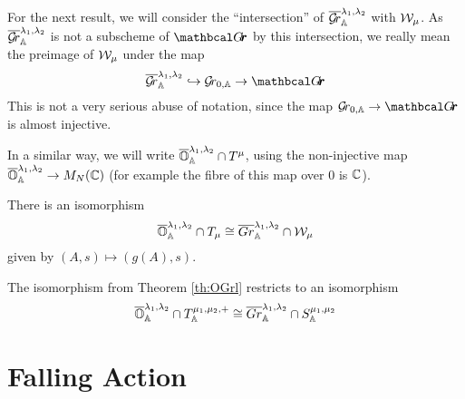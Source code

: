 \documentclass[draft]{article}
\begin{document}
For the next result, we will consider the ``intersection'' of $ \overline{\mathcal{G}\!r}^{\lambda_1, \lambda_2}_\mathbb A $ with $\mathcal W_\mu$.  As $  \overline{\mathcal{G}\!r}^{\lambda_1, \lambda_2}_\mathbb A $ is not a subscheme of $ \Grth$ by this intersection, we really mean the preimage of $ \mathcal W_\mu$ under the map $$ \overline{\Gr}^{\lambda_1, \lambda_2}_\AA  \hookrightarrow \Grbd \rightarrow \Grth$$
This is not a very serious abuse of notation, since the map $ \Grbd \rightarrow \Grth $ is almost injective.

In a similar way, we will write $ \overline{\mathbb O}^{\lambda_1, \lambda_2}_\mathbb A \cap T^\mu$, using the non-injective map $ \overline{\mathbb O}^{\lambda_1, \lambda_2}_\mathbb A \rightarrow M_N(\mathbb C)$ (for example the fibre of this map over $ 0 $ is $ \mathbb C $).

\begin{theorem} \label{th:OGrl}
    There is an isomorphism
    $$\overline{\mathbb O}^{\lambda_1, \lambda_2}_\mathbb A \cap T_\mu \cong \overline{Gr}^{\lambda_1, \lambda_2}_\mathbb A \cap \mathcal W_\mu $$
    given by $ (A,s) \mapsto (g(A), s)$.
\end{theorem}

\begin{theorem}
    The isomorphism from Theorem \ref{th:OGrl} restricts to an isomorphism
    $$ \overline{\mathbb O}^{\lambda_1, \lambda_2}_\mathbb A \cap T^{\mu_1, \mu_2, +}_\mathbb A \cong \overline{Gr}^{\lambda_1, \lambda_2}_\mathbb A \cap S^{\mu_1, \mu_2}_\mathbb A$$
\end{theorem}


\section{Falling Action} %
\end{document}
